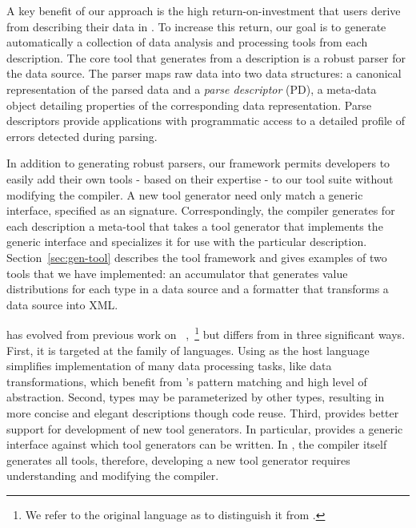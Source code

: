 

A key benefit of our approach is the high return-on-investment that
users derive from describing their data in \padsml{}.  To increase
this return, our goal is to generate automatically a collection of
data analysis and processing tools from each description.  The core
tool that \padsml{} generates from a description is a robust parser
for the data source.  The parser maps raw data into two data
structures: a canonical representation of the parsed data and a
\textit{parse descriptor} (PD), a meta-data object detailing
properties of the corresponding data representation.  Parse
descriptors provide applications with programmatic access to a
detailed profile of errors detected during parsing.

In addition to generating robust parsers, our framework permits
developers to easily add their own tools - based on their expertise -
to our tool suite without modifying the \padsml{} compiler.  A new
tool generator need only match a generic interface, specified as an
\ml{} signature.  Correspondingly, the \padsml{} compiler generates
for each \padsml{} description a meta-tool that takes a tool generator
that implements the generic interface and specializes it for use with
the particular description.  Section~\ref{sec:gen-tool} describes
the tool framework and gives examples of two tools that we have
implemented: an accumulator that generates value distributions for
each type in a data source and a formatter that transforms a data
source into XML.

\padsml{} has evolved from previous work
on \padsc{}~\cite{fisher+:pads},~\footnote{We refer to the original
\pads{} language as \padsc{} to distinguish it from \padsml{}.} but
\padsml{} differs from \padsc{} in three significant ways.  First, it
is targeted at the \ml{} family of languages.  Using \ml{} as the host
language simplifies implementation of many data processing tasks, like
data transformations, which benefit from \ml{}'s pattern matching and
high level of abstraction.  Second, \padsml{} types may be
parameterized by other types, resulting in more concise and elegant
descriptions though code reuse.  Third, \padsml{} provides better
support for development of new tool generators.  In particular,
\padsml{} provides a generic interface against which tool generators
can be written.  In \padsc{}, the compiler itself generates all tools,
therefore, developing a new tool generator requires understanding and
modifying the compiler.

